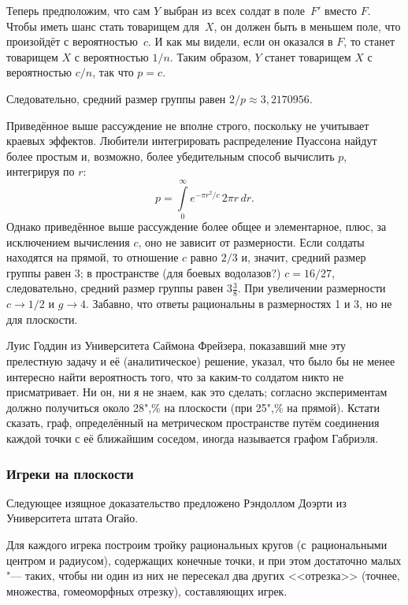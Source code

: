 \documentclass[twoside]{book}
\begin{document}
Теперь предположим, что сам $Y$ выбран из всех солдат в поле~$F'$
вместо $F$.
Чтобы иметь шанс стать товарищем для~$X$, он должен быть
в меньшем поле, что произойдёт с вероятностью~$c$.
И как мы видели,
если он оказался в $F$, то станет товарищем $X$ с вероятностью $1/n$.
Таким образом, $Y$ станет товарищем $X$ с вероятностью $c/n$, так что
$p=c$.

Следовательно, средний размер группы равен $2/p\approx3{,}2170956$.
\heart

\medskip
Приведённое выше рассуждение не вполне строго, поскольку не учитывает
краевых эффектов.
Любители интегрировать распределение Пуассона
найдут более простым и, возможно, более убедительным способ вычислить
$p$, интегрируя по $r$:
\[
p=\int\limits_0^\infty e^{-\pi r^2/c}\,2\pi r\, dr.
\]
Однако приведённое выше рассуждение более общее и элементарное, плюс,
за исключением вычисления $c$, оно не зависит от размерности.
Если
солдаты находятся на прямой, то отношение $c$ равно $2/3$ и, значит,
средний размер группы равен 3; в пространстве (для боевых водолазов?)
$c = 16/27$, следовательно, средний размер группы равен $3\tfrac38$.
При увеличении размерности $c\to 1/2$ и $g\to 4$.
Забавно, что ответы
рациональны в размерностях 1 и 3, но не для плоскости.

Луис Годдин из Университета Саймона Фрейзера, показавший мне эту
прелестную задачу и её (аналитическое) решение, указал, что было бы не
менее интересно найти вероятность того, что за каким-то солдатом никто
не присматривает.
Ни он, ни я не знаем, как это сделать; согласно
экспериментам должно получиться около 28",\% на плоскости (при 25",\%
на прямой).
Кстати сказать, граф, определённый на метрическом
пространстве путём соединения каждой точки с её ближайшим соседом,
иногда называется графом Габриэля.

\subsubsection*{Игреки на плоскости}

Следующее изящное доказательство предложено Рэндоллом Доэрти из
Университета штата Огайо.

\medskip

Для каждого игрека построим тройку рациональных кругов
(с~рациональными центром и радиусом), содержащих конечные точки, и при
этом достаточно малых "--- таких, чтобы ни один из них не пересекал
два других <<отрезка>> (точнее, множества, гомеоморфных отрезку),
составляющих игрек.
\end{document}
